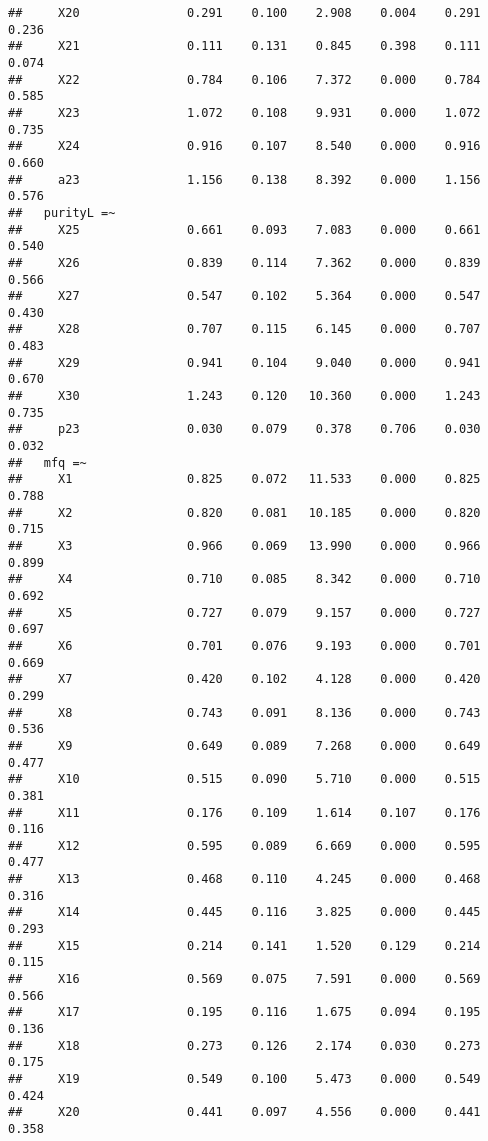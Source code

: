 \documentclass[english,man]{apa6}
\theoremstyle{definition}
\theoremstyle{definition}
\theoremstyle{definition}
\theoremstyle{remark}
\begin{document}
\begin{verbatim}
##     X20               0.291    0.100    2.908    0.004    0.291    0.236
##     X21               0.111    0.131    0.845    0.398    0.111    0.074
##     X22               0.784    0.106    7.372    0.000    0.784    0.585
##     X23               1.072    0.108    9.931    0.000    1.072    0.735
##     X24               0.916    0.107    8.540    0.000    0.916    0.660
##     a23               1.156    0.138    8.392    0.000    1.156    0.576
##   purityL =~                                                            
##     X25               0.661    0.093    7.083    0.000    0.661    0.540
##     X26               0.839    0.114    7.362    0.000    0.839    0.566
##     X27               0.547    0.102    5.364    0.000    0.547    0.430
##     X28               0.707    0.115    6.145    0.000    0.707    0.483
##     X29               0.941    0.104    9.040    0.000    0.941    0.670
##     X30               1.243    0.120   10.360    0.000    1.243    0.735
##     p23               0.030    0.079    0.378    0.706    0.030    0.032
##   mfq =~                                                                
##     X1                0.825    0.072   11.533    0.000    0.825    0.788
##     X2                0.820    0.081   10.185    0.000    0.820    0.715
##     X3                0.966    0.069   13.990    0.000    0.966    0.899
##     X4                0.710    0.085    8.342    0.000    0.710    0.692
##     X5                0.727    0.079    9.157    0.000    0.727    0.697
##     X6                0.701    0.076    9.193    0.000    0.701    0.669
##     X7                0.420    0.102    4.128    0.000    0.420    0.299
##     X8                0.743    0.091    8.136    0.000    0.743    0.536
##     X9                0.649    0.089    7.268    0.000    0.649    0.477
##     X10               0.515    0.090    5.710    0.000    0.515    0.381
##     X11               0.176    0.109    1.614    0.107    0.176    0.116
##     X12               0.595    0.089    6.669    0.000    0.595    0.477
##     X13               0.468    0.110    4.245    0.000    0.468    0.316
##     X14               0.445    0.116    3.825    0.000    0.445    0.293
##     X15               0.214    0.141    1.520    0.129    0.214    0.115
##     X16               0.569    0.075    7.591    0.000    0.569    0.566
##     X17               0.195    0.116    1.675    0.094    0.195    0.136
##     X18               0.273    0.126    2.174    0.030    0.273    0.175
##     X19               0.549    0.100    5.473    0.000    0.549    0.424
##     X20               0.441    0.097    4.556    0.000    0.441    0.358

\end{verbatim}
\end{document}
